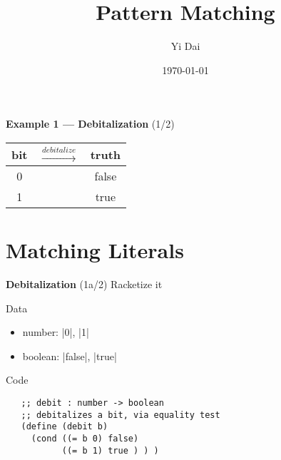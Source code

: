 \documentclass[14pt]{beamer}
\title{\bf Pattern Matching}
\author{Yi Dai}
\date{\today}
\begin{document}
\begin{frame}[plain]
 \maketitle
\end{frame}

\begin{frame}[fragile]{{\bf Example 1 --- Debitalization} (1/2)}
 \large
 \begin{table}
  \centering
  \begin{tabular}{ccc}
   bit & $\overset{debitalize}{\longrightarrow}$ & truth \\
   \hline
   0   &                                         & false \\
   1   &                                         & true  \\
  \end{tabular}
 \end{table}
\end{frame}

\section{Matching Literals}

\begin{frame}[fragile]{{\bf Debitalization} (1a/2)}
 Racketize it

 \pause

 Data
 \begin{itemize}
  \item number: |0|, |1|
  \item boolean: |false|, |true|
 \end{itemize}

 \pause

 Code
 {\footnotesize
  \begin{verbatim}
   ;; debit : number -> boolean
   ;; debitalizes a bit, via equality test
   (define (debit b)
     (cond ((= b 0) false)
           ((= b 1) true ) ) )
  \end{verbatim}
 }
\end{frame}
\end{document}
